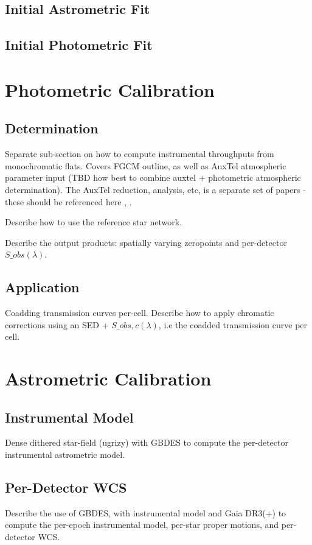 \subsection{Initial Astrometric Fit}

\subsection{Initial Photometric Fit}

\section{Photometric Calibration}

\subsection{Determination}
Separate sub-section on how to compute instrumental throughputs from monochromatic flats.
Covers FGCM outline, as well as AuxTel atmospheric parameter input (TBD how best to combine auxtel + photometric atmospheric determination). 
The AuxTel reduction, analysis, etc, is a separate set of papers - these should be referenced here \cite{pstn-028}, \cite{pstn-027}.

Describe how to use the reference star network.

Describe the output products: spatially varying zeropoints and per-detector $S\_obs(\lambda)$.

\subsection{Application}
Coadding transmission curves per-cell. 
Describe how to apply chromatic corrections using an SED + $S\_obs,c(\lambda)$, i.e the coadded transmission curve per cell.


\section{Astrometric Calibration}

\subsection{Instrumental Model}
Dense dithered star-field (ugrizy) with GBDES to compute the per-detector instrumental astrometric model.

\subsection{Per-Detector WCS}
Describe the use of GBDES, with instrumental model and Gaia DR3(+) to compute the per-epoch instrumental model, per-star proper motions, and per-detector WCS.




	